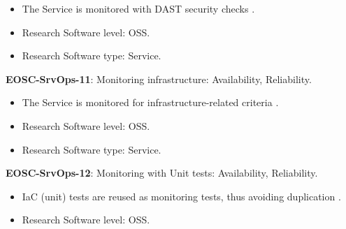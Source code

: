 \begin{itemize}
    \item The Service is monitored with DAST security checks \cite{orviz_fernandez_eosc-synergy_2020}.
    \item Research Software level: OSS.
    \item Research Software type: Service.
\end{itemize}

\textbf{EOSC-SrvOps-11}: Monitoring infrastructure: Availability, Reliability.

\begin{itemize}
    \item The Service is monitored for infrastructure-related criteria \cite{orviz_fernandez_eosc-synergy_2020}.
    \item Research Software level: OSS.
    \item Research Software type: Service.
\end{itemize}

\textbf{EOSC-SrvOps-12}: Monitoring with Unit tests: Availability, Reliability.

\begin{itemize}
    \item IaC (unit) tests are reused as monitoring tests, thus avoiding duplication \cite{orviz_fernandez_eosc-synergy_2020}.
    \item Research Software level: OSS.
\end{itemize}

